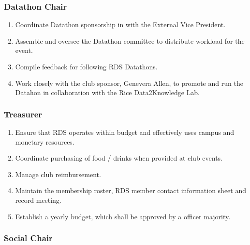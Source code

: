 \documentclass[12pt]{article}
\begin{document}

\subsubsection{Datathon Chair}
\begin{enumerate}
  \item Coordinate Datathon sponsorship in with the External Vice President.

  \item Assemble and oversee the Datathon committee to distribute workload for
    the event. 

  \item Compile feedback for following RDS Datathons.

  \item Work closely with the club sponsor, Genevera Allen, to promote and 
    run the Datahon in collaboration with the Rice Data2Knowledge Lab.
\end{enumerate}


\subsubsection{Treasurer}
\begin{enumerate}
  \item Ensure that RDS operates within budget and effectively uses campus and
    monetary resources. 

  \item Coordinate purchasing of food / drinks when provided at club events. 

  \item Manage club reimbursement. 

  \item Maintain the membership roster, RDS member contact information sheet
    and record meeting. 

  \item Establish a yearly budget, which shall be approved by a 
    officer majority. 
\end{enumerate}


\subsubsection{Social Chair}
\end{document}
